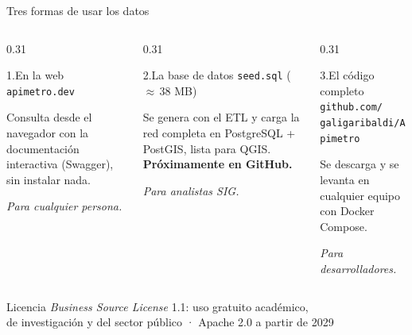 \begin{frame}{Tres formas de usar los datos}
  \begin{columns}[T]
    \begin{column}{0.31\textwidth}
      \begin{exampleblock}{\footnotesize 1.\enspace En la web}
        \scriptsize
        \texttt{apimetro.dev}

        \vspace{0.1cm}
        Consulta desde el navegador con la documentación interactiva
        (Swagger), sin instalar nada.

        \vspace{0.1cm}
        {\itshape Para cualquier persona.}
      \end{exampleblock}
    \end{column}
    \begin{column}{0.31\textwidth}
      \begin{block}{\footnotesize 2.\enspace La base de datos}
        \scriptsize
        \texttt{seed.sql} ($\approx$\,38 MB)

        \vspace{0.1cm}
        Se genera con el ETL y carga la red completa en PostgreSQL + PostGIS,
        lista para QGIS. \textbf{Próximamente en GitHub.}

        \vspace{0.1cm}
        {\itshape Para analistas SIG.}
      \end{block}
    \end{column}
    \begin{column}{0.31\textwidth}
      \begin{alertblock}{\footnotesize 3.\enspace El código completo}
        \scriptsize
        \texttt{github.com/}\\
        \texttt{galigaribaldi/Apimetro}

        \vspace{0.1cm}
        Se descarga y se levanta en cualquier equipo con Docker Compose.

        \vspace{0.1cm}
        {\itshape Para desarrolladores.}
      \end{alertblock}
    \end{column}
  \end{columns}

  \vspace{0.4cm}
  \centering\scriptsize
  Licencia \textit{Business Source License} 1.1: uso gratuito académico,\\
  de investigación y del sector público · Apache 2.0 a partir de 2029
\end{frame}
